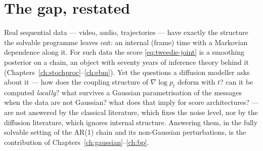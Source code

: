 \section{The gap, restated}\label{sec:gap}

Real sequential data --- video, audio, trajectories --- have exactly the
structure the solvable programme leaves out: an internal (frame) time with a
Markovian dependence along it. For such data the score
\eqref{eq:tweedie-joint} is a smoothing posterior on a chain, an object with
seventy years of inference theory behind it
(Chapters~\ref{ch:stochproc}--\ref{ch:ebm}). Yet the questions a diffusion
modeller asks about it --- how does the coupling structure of
$\nabla \log p_t$ deform with $t$? can it be computed \emph{locally}? what
survives a Gaussian parametrisation of the messages when the data are not
Gaussian? what does that imply for score architectures? --- are not answered
by the classical literature, which fixes the noise level, nor by the
diffusion literature, which ignores internal structure. Answering them, in
the fully solvable setting of the AR(1) chain and its non-Gaussian
perturbations, is the contribution of
Chapters~\ref{ch:gaussian}--\ref{ch:bp}.
